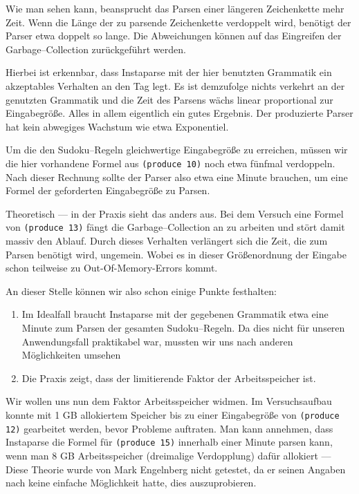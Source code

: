 \documentclass[ngerman,a4paper,abstracton,open=right,twoside=false,toc=listofnumbered,bibtotocnumbered]{scrreprt}
\begin{document}
Wie man sehen kann, beansprucht das Parsen einer längeren Zeichenkette mehr Zeit. Wenn die Länge der zu parsende Zeichenkette verdoppelt wird, benötigt der Parser etwa doppelt so lange. Die Abweichungen können auf das Eingreifen der Garbage--Collection zurückgeführt werden.

Hierbei ist erkennbar, dass Instaparse mit der hier benutzten Grammatik ein akzeptables Verhalten an den Tag legt. Es ist demzufolge nichts verkehrt an der genutzten Grammatik und die Zeit des Parsens wächs linear proportional zur Eingabegröße. Alles in allem eigentlich ein gutes Ergebnis. Der produzierte Parser hat kein abwegiges Wachstum wie etwa Exponentiel.

Um die den Sudoku--Regeln gleichwertige Eingabegröße zu erreichen, müssen wir die hier vorhandene Formel aus \lstinline|(produce 10)| noch etwa fünfmal verdoppeln. Nach dieser Rechnung sollte der Parser also etwa eine Minute brauchen, um eine Formel der geforderten Eingabegröße zu Parsen.

Theoretisch --- in der Praxis sieht das anders aus. Bei dem Versuch eine Formel von \lstinline|(produce 13)| fängt die Garbage--Collection an zu arbeiten und stört damit massiv den Ablauf. Durch dieses Verhalten verlängert sich die Zeit, die zum Parsen benötigt wird, ungemein. Wobei es in dieser Größenordnung der Eingabe schon teilweise zu Out-Of-Memory-Errors kommt.


An dieser Stelle können wir also schon einige Punkte festhalten:

\begin{enumerate}
	\item Im Idealfall braucht Instaparse mit der gegebenen Grammatik etwa eine Minute zum Parsen der gesamten Sudoku--Regeln. Da dies nicht für unseren Anwendungsfall praktikabel war, mussten wir uns nach anderen Möglichkeiten umsehen
	\item Die Praxis zeigt, dass der limitierende Faktor der Arbeitsspeicher ist.
\end{enumerate}

Wir wollen uns nun dem Faktor Arbeitsspeicher widmen. Im Versuchsaufbau konnte mit 1 GB allokiertem Speicher bis zu einer Eingabegröße von \lstinline|(produce 12)| gearbeitet werden, bevor Probleme auftraten. Man kann annehmen, dass Instaparse die Formel für \lstinline|(produce 15)| innerhalb einer Minute parsen kann, wenn man 8 GB Arbeitsspeicher (dreimalige Verdopplung) dafür allokiert --- Diese Theorie wurde von Mark Engelnberg nicht getestet, da er seinen Angaben nach keine einfache Möglichkeit hatte, dies auszuprobieren.\\
\end{document}
